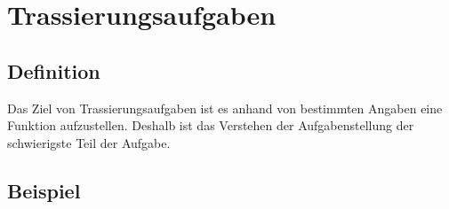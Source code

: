 \section{Trassierungsaufgaben}
\subsection{Definition}
\begin{flushleft}
    Das Ziel von Trassierungsaufgaben ist es anhand von bestimmten Angaben eine Funktion aufzustellen.
    Deshalb ist das Verstehen der Aufgabenstellung der schwierigste Teil der Aufgabe.
\end{flushleft}

\subsection{Beispiel}
